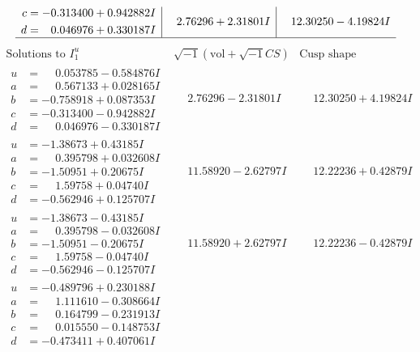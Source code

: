 \documentclass[1p]{elsarticle_modified}
\theoremstyle{definition}
\newcommand{\I}{\sqrt{-1}}
\begin{document}
$$\begin{array}{c|c|c}
\begin{aligned}
c &= -0.313400 + 0.942882 I \\
d &= \phantom{-}0.046976 + 0.330187 I\end{aligned}
 & \phantom{-}2.76296 + 2.31801 I & \phantom{-}12.30250 - 4.19824 I\\
 \hline 
 \end{array}$$\newpage$$\begin{array}{c|c|c}  
\text{Solutions to }I^u_{1}& \I (\text{vol} + \sqrt{-1}CS) & \text{Cusp shape}\\
 \hline 
\begin{aligned}
u &= \phantom{-}0.053785 - 0.584876 I \\
a &= \phantom{-}0.567133 + 0.028165 I \\
b &= -0.758918 + 0.087353 I \\
c &= -0.313400 - 0.942882 I \\
d &= \phantom{-}0.046976 - 0.330187 I\end{aligned}
 & \phantom{-}2.76296 - 2.31801 I & \phantom{-}12.30250 + 4.19824 I \\ \hline\begin{aligned}
u &= -1.38673 + 0.43185 I \\
a &= \phantom{-}0.395798 + 0.032608 I \\
b &= -1.50951 + 0.20675 I \\
c &= \phantom{-}1.59758 + 0.04740 I \\
d &= -0.562946 + 0.125707 I\end{aligned}
 & \phantom{-}11.58920 - 2.62797 I & \phantom{-}12.22236 + 0.42879 I \\ \hline\begin{aligned}
u &= -1.38673 - 0.43185 I \\
a &= \phantom{-}0.395798 - 0.032608 I \\
b &= -1.50951 - 0.20675 I \\
c &= \phantom{-}1.59758 - 0.04740 I \\
d &= -0.562946 - 0.125707 I\end{aligned}
 & \phantom{-}11.58920 + 2.62797 I & \phantom{-}12.22236 - 0.42879 I \\ \hline\begin{aligned}
u &= -0.489796 + 0.230188 I \\
a &= \phantom{-}1.111610 - 0.308664 I \\
b &= \phantom{-}0.164799 - 0.231913 I \\
c &= \phantom{-}0.015550 - 0.148753 I \\
d &= -0.473411 + 0.407061 I\end{aligned}

\end{array}$$
\end{document}
